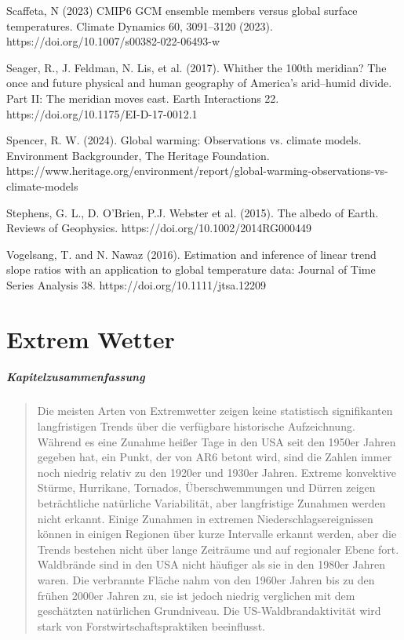 \documentclass[12pt,paper=a4,DIV=12,parskip=never,chapterprefix=false,headings=standardclasses]{scrreprt}
\newcommand{\FigureNumbersBySection}{%
  \counterwithout{figure}{chapter}%
  \counterwithin{figure}{section}%
}
\begin{document}
Scaffeta, N (2023) CMIP6 GCM ensemble members versus global surface temperatures. Climate Dynamics
60, 3091–3120 (2023). https://doi.org/10.1007/s00382-022-06493-w

Seager, R., J. Feldman, N. Lis, et al. (2017). Whither the 100th meridian? The once and future physical
and human geography of America’s arid–humid divide. Part II: The meridian moves east. Earth
Interactions 22. https://doi.org/10.1175/EI-D-17-0012.1

Spencer, R. W. (2024). Global warming: Observations vs. climate models. Environment Backgrounder,
The Heritage Foundation.
https://www.heritage.org/environment/report/global-warming-observations-vs-climate-models

Stephens, G. L., D. O'Brien, P.J. Webster et al. (2015). The albedo of Earth. Reviews of Geophysics.
https://doi.org/10.1002/2014RG000449

Vogelsang, T. and N. Nawaz (2016). Estimation and inference of linear trend slope ratios with an
application to global temperature data: Journal of Time Series Analysis 38.
https://doi.org/10.1111/jtsa.12209
\endgroup

\cleardoublepage
\FigureNumbersBySection
\chapter{Extrem Wetter}
\paragraph{Kapitelzusammenfassung}
\begin{quote}
Die meisten Arten von Extremwetter zeigen keine statistisch signifikanten langfristigen Trends über die verfügbare historische Aufzeichnung. Während es eine Zunahme heißer Tage in den USA seit den 1950er Jahren gegeben hat, ein Punkt, der von AR6 betont wird, sind die Zahlen immer noch niedrig relativ zu den 1920er und 1930er Jahren. Extreme konvektive Stürme, Hurrikane, Tornados, Überschwemmungen und Dürren zeigen beträchtliche natürliche Variabilität, aber langfristige Zunahmen werden nicht erkannt.
Einige Zunahmen in extremen Niederschlagsereignissen können in einigen Regionen über kurze Intervalle erkannt werden, aber die Trends bestehen nicht über lange Zeiträume und auf regionaler Ebene fort. Waldbrände sind in den USA nicht häufiger als sie in den 1980er Jahren waren. Die verbrannte Fläche nahm von den 1960er Jahren bis zu den frühen 2000er Jahren zu, sie ist jedoch niedrig verglichen mit dem geschätzten natürlichen Grundniveau. Die US-Waldbrandaktivität wird stark von Forstwirtschaftspraktiken beeinflusst.
\end{quote}
\end{document}
